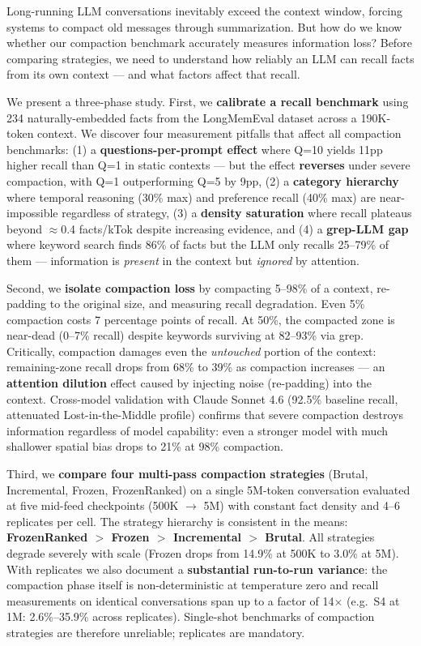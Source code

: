 Long-running LLM conversations inevitably exceed the context window, forcing
systems to compact old messages through summarization. But how do we know
whether our compaction benchmark accurately measures information loss? Before
comparing strategies, we need to understand how reliably an LLM can recall
facts from its own context --- and what factors affect that recall.

We present a three-phase study. First, we \textbf{calibrate a recall benchmark}
using 234 naturally-embedded facts from the LongMemEval dataset across a
190K-token context. We discover four measurement pitfalls that affect all
compaction benchmarks: (1) a \textbf{questions-per-prompt effect} where Q=10 yields
11pp higher recall than Q=1 in static contexts --- but the effect \textbf{reverses}
under severe compaction, with Q=1 outperforming Q=5 by 9pp,
(2) a \textbf{category hierarchy} where temporal reasoning (30\% max) and preference
recall (40\% max) are near-impossible regardless of strategy, (3) a \textbf{density
saturation} where recall plateaus beyond $\approx$0.4 facts/kTok despite increasing
evidence, and (4) a \textbf{grep-LLM gap} where keyword search finds 86\% of facts
but the LLM only recalls 25--79\% of them --- information is \textit{present} in the
context but \textit{ignored} by attention.

Second, we \textbf{isolate compaction loss} by compacting 5--98\% of a context,
re-padding to the original size, and measuring recall degradation. Even 5\%
compaction costs 7 percentage points of recall. At 50\%, the compacted zone is
near-dead (0--7\% recall) despite keywords surviving at 82--93\% via grep.
Critically, compaction damages even the \textit{untouched} portion of the context:
remaining-zone recall drops from 68\% to 39\% as compaction increases --- an
\textbf{attention dilution} effect caused by injecting noise (re-padding) into the
context. Cross-model validation with Claude Sonnet 4.6 (92.5\% baseline recall,
attenuated Lost-in-the-Middle profile) confirms that severe compaction
destroys information regardless of model capability: even a stronger
model with much shallower spatial bias drops to 21\% at 98\% compaction.

Third, we \textbf{compare four multi-pass compaction strategies} (Brutal,
Incremental, Frozen, FrozenRanked) on a single 5M-token conversation
evaluated at five mid-feed checkpoints (500K $\to$ 5M) with constant fact
density and 4--6 replicates per cell. The strategy hierarchy is consistent
in the means: \textbf{FrozenRanked $>$ Frozen $>$ Incremental $>$ Brutal}. All
strategies degrade severely with scale (Frozen drops from 14.9\% at 500K
to 3.0\% at 5M). With replicates we also document a \textbf{substantial run-to-run
variance}: the compaction phase itself is non-deterministic at temperature
zero and recall measurements on identical conversations span up to a factor
of 14$\times$ (e.g.\ S4 at 1M: 2.6\%--35.9\% across replicates). Single-shot
benchmarks of compaction strategies are therefore unreliable; replicates
are mandatory.

